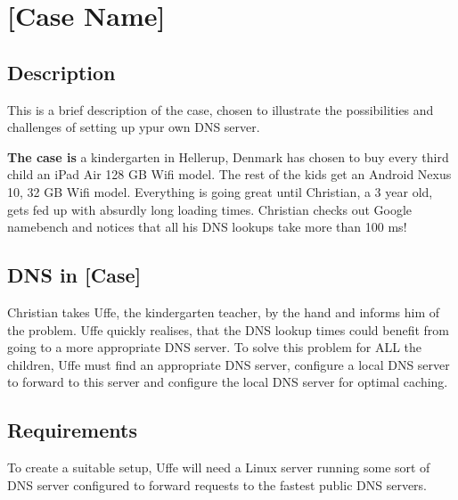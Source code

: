 \chapter{[Case Name]}
\section{Description}
This is a brief description of the case, chosen to illustrate the possibilities and challenges of setting up ypur own DNS server.

\textbf{The case is}
a kindergarten in Hellerup, Denmark has chosen to buy every third child an iPad Air 128 GB Wifi model. The rest of the kids get an Android Nexus 10, 32 GB Wifi model. Everything is going great until Christian, a 3 year old, gets fed up with absurdly long loading times. Christian checks out Google namebench and notices that all his DNS lookups take more than 100 ms!

\section{DNS in [Case]}

Christian takes Uffe, the kindergarten teacher, by the hand and informs him of the problem. Uffe quickly realises, that the DNS lookup times could benefit from going to a more appropriate DNS server. To solve this problem for ALL the children, Uffe must find an appropriate DNS server, configure a local DNS server to forward to this server and configure the local DNS server for optimal caching.


\section{Requirements}
To create a suitable setup, Uffe will need a Linux server running some sort of DNS server configured to forward requests to the fastest public DNS servers.
